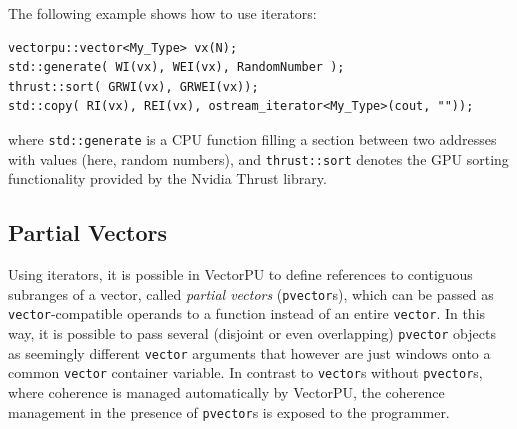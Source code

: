 \begin{example}
The following example shows how to use iterators:

{\footnotesize \begin{verbatim}
vectorpu::vector<My_Type> vx(N);
std::generate( WI(vx), WEI(vx), RandomNumber );
thrust::sort( GRWI(vx), GRWEI(vx));
std::copy( RI(vx), REI(vx), ostream_iterator<My_Type>(cout, ""));
\end{verbatim}}

\noindent 
where \verb.std::generate. is a CPU function filling a section between
two addresses with values (here, random numbers),
and \verb.thrust::sort. denotes the GPU sorting functionality
provided by the Nvidia Thrust library. 
\end{example}





\subsection{Partial Vectors}
\label{sec:Partial Vectors}


Using iterators, it is possible in VectorPU to define references to
contiguous subranges of a vector,
called \textit{partial vectors} (\texttt{pvector}s), 
which can be passed as \texttt{vector}-compatible
operands to a function instead of an entire \texttt{vector}.
In this way, it is possible to pass several (disjoint or even
overlapping) \texttt{pvector} objects as seemingly different \texttt{vector}
arguments that however are just windows onto
a common \texttt{vector} container variable. 
In contrast to \texttt{vector}s without \texttt{pvector}s, where coherence is 
managed automatically by VectorPU, the coherence 
management in the presence of \texttt{pvector}s 
is exposed to the programmer.

